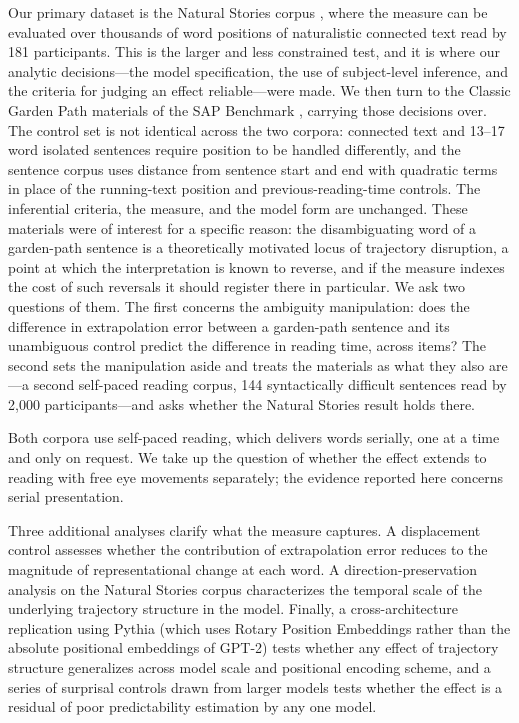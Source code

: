 \documentclass[12pt]{article}
\newcommand{\new}[1]{#1}   %
\begin{document}
\new{Our primary dataset is the Natural Stories corpus \citep{futrell2018}, where the measure can be evaluated over thousands of word positions of naturalistic connected text read by 181 participants. This is the larger and less constrained test, and it is where our analytic decisions---the model specification, the use of subject-level inference, and the criteria for judging an effect reliable---were made. We then turn to the Classic Garden Path materials of the SAP Benchmark \citep{huang2024}, carrying those decisions over. The control set is not identical across the two corpora: connected text and 13--17 word isolated sentences require position to be handled differently, and the sentence corpus uses distance from sentence start and end with quadratic terms in place of the running-text position and previous-reading-time controls. The inferential criteria, the measure, and the model form are unchanged. These materials were of interest for a specific reason: the disambiguating word of a garden-path sentence is a theoretically motivated locus of trajectory disruption, a point at which the interpretation is known to reverse, and if the measure indexes the cost of such reversals it should register there in particular. We ask two questions of them. The first concerns the ambiguity manipulation: does the difference in extrapolation error between a garden-path sentence and its unambiguous control predict the difference in reading time, across items? The second sets the manipulation aside and treats the materials as what they also are---a second self-paced reading corpus, 144 syntactically difficult sentences read by 2,000 participants---and asks whether the Natural Stories result holds there.}

\new{Both corpora use self-paced reading, which delivers words serially, one at a time and only on request. We take up the question of whether the effect extends to reading with free eye movements separately; the evidence reported here concerns serial presentation.}

Three additional analyses clarify what the measure captures. A displacement control assesses whether the contribution of extrapolation error reduces to the magnitude of representational change at each word. A direction-preservation analysis on the Natural Stories corpus characterizes the temporal scale of the underlying trajectory structure in the model. Finally, \new{a cross-architecture replication using Pythia (which uses Rotary Position Embeddings rather than the absolute positional embeddings of GPT-2) tests whether any effect of trajectory structure generalizes across model scale and positional encoding scheme, and a series of surprisal controls drawn from larger models tests whether the effect is a residual of poor predictability estimation by any one model}.
\end{document}
